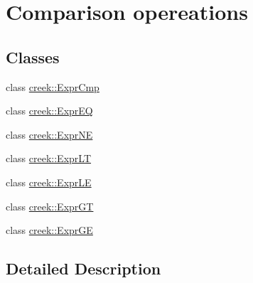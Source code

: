 \hypertarget{group__expression__comparison}{}\section{Comparison opereations}
\label{group__expression__comparison}
\subsection*{Classes}
\begin{DoxyCompactItemize}
\item 
class \hyperlink{classcreek_1_1_expr_cmp}{creek\+::\+Expr\+Cmp}
\item 
class \hyperlink{classcreek_1_1_expr_e_q}{creek\+::\+Expr\+EQ}
\item 
class \hyperlink{classcreek_1_1_expr_n_e}{creek\+::\+Expr\+NE}
\item 
class \hyperlink{classcreek_1_1_expr_l_t}{creek\+::\+Expr\+LT}
\item 
class \hyperlink{classcreek_1_1_expr_l_e}{creek\+::\+Expr\+LE}
\item 
class \hyperlink{classcreek_1_1_expr_g_t}{creek\+::\+Expr\+GT}
\item 
class \hyperlink{classcreek_1_1_expr_g_e}{creek\+::\+Expr\+GE}
\end{DoxyCompactItemize}


\subsection{Detailed Description}
